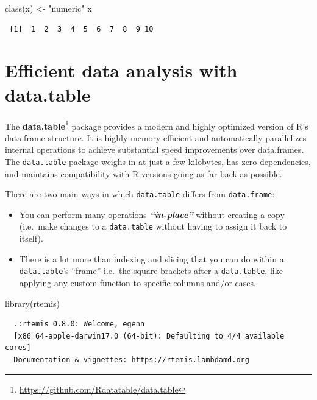 \documentclass[
]{book}
\newenvironment{Shaded}{\begin{snugshade}}{\end{snugshade}}
\newcommand{\FunctionTok}[1]{\textcolor[rgb]{0.00,0.00,0.00}{#1}}
\newcommand{\NormalTok}[1]{#1}
\newcommand{\OtherTok}[1]{\textcolor[rgb]{0.56,0.35,0.01}{#1}}
\newcommand{\StringTok}[1]{\textcolor[rgb]{0.31,0.60,0.02}{#1}}
\providecommand{\tightlist}{%
  \setlength{\itemsep}{0pt}\setlength{\parskip}{0pt}}
\renewcommand{\href}[2]{#2\footnote{\url{#1}}}
\begin{document}
\begin{Shaded}
\begin{Highlighting}[]
\FunctionTok{class}\NormalTok{(x) }\OtherTok{\textless{}{-}} \StringTok{"numeric"}
\NormalTok{x}
\end{Highlighting}
\end{Shaded}

\begin{verbatim}
 [1]  1  2  3  4  5  6  7  8  9 10
\end{verbatim}

\hypertarget{datatable}{%
\chapter{\texorpdfstring{Efficient data analysis with \textbf{data.table}}{Efficient data analysis with data.table}}\label{datatable}}

The \href{https://github.com/Rdatatable/data.table}{\textbf{data.table}} package provides a modern and highly optimized version of R's data.frame structure. It is highly memory efficient and automatically parallelizes internal operations to achieve substantial speed improvements over data.frames. The \texttt{data.table} package weighs in at just a few kilobytes, has zero dependencies, and maintains compatibility with R versions going as far back as possible.

There are two main ways in which \texttt{data.table} differs from \texttt{data.frame}:

\begin{itemize}
\tightlist
\item
  You can perform many operations \textbf{\emph{``in-place''}} without creating a copy (i.e.~make changes to a \texttt{data.table} without having to assign it back to itself).
\item
  There is a lot more than indexing and slicing that you can do within a \texttt{data.table}'s ``frame'' i.e.~the square brackets after a \texttt{data.table}, like applying any custom function to specific columns and/or cases.
\end{itemize}

\begin{Shaded}
\begin{Highlighting}[]
\FunctionTok{library}\NormalTok{(rtemis)}
\end{Highlighting}
\end{Shaded}

\begin{verbatim}
  .:rtemis 0.8.0: Welcome, egenn
  [x86_64-apple-darwin17.0 (64-bit): Defaulting to 4/4 available cores]
  Documentation & vignettes: https://rtemis.lambdamd.org
\end{verbatim}
\end{document}
